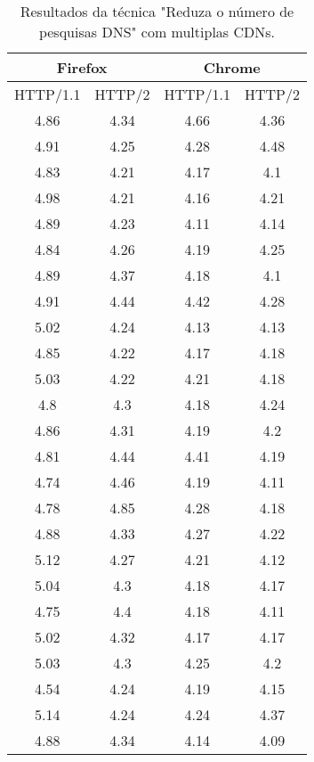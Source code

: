 \begin{table}[H]
	\centering
	\caption{Resultados da técnica "Reduza o número de pesquisas DNS" com multiplas CDNs.}
	\label{resultados-reduzaonumerodepesquisasdns-multiplas}
	\begin{tabular}{cccc}
		\hline
		\multicolumn{2}{c}{\textbf{Firefox}} & \multicolumn{2}{c}{\textbf{Chrome}} \\
		\hline
		HTTP/1.1 & HTTP/2 & HTTP/1.1 & HTTP/2 \\
		\hline
		4.86 & 4.34 & 4.66 & 4.36 \\
		4.91 & 4.25 & 4.28 & 4.48 \\
		4.83 & 4.21 & 4.17 & 4.1 \\
		4.98 & 4.21 & 4.16 & 4.21 \\
		4.89 & 4.23 & 4.11 & 4.14 \\
		4.84 & 4.26 & 4.19 & 4.25 \\
		4.89 & 4.37 & 4.18 & 4.1 \\
		4.91 & 4.44 & 4.42 & 4.28 \\
		5.02 & 4.24 & 4.13 & 4.13 \\
		4.85 & 4.22 & 4.17 & 4.18 \\
		5.03 & 4.22 & 4.21 & 4.18 \\
		4.8 & 4.3 & 4.18 & 4.24 \\
		4.86 & 4.31 & 4.19 & 4.2 \\
		4.81 & 4.44 & 4.41 & 4.19 \\ 
		4.74 & 4.46 & 4.19 & 4.11 \\
		4.78 & 4.85 & 4.28 & 4.18 \\
		4.88 & 4.33 & 4.27 & 4.22 \\ 
		5.12 & 4.27 & 4.21 & 4.12 \\
		5.04 & 4.3 & 4.18 & 4.17 \\
		4.75 & 4.4 & 4.18 & 4.11 \\
		5.02 & 4.32 & 4.17 & 4.17 \\
		5.03 & 4.3 & 4.25 & 4.2 \\
		4.54 & 4.24 & 4.19 & 4.15 \\
		5.14 & 4.24 & 4.24 & 4.37 \\
		4.88 & 4.34 & 4.14 & 4.09 \\
		\hline
	\end{tabular}
\end{table}